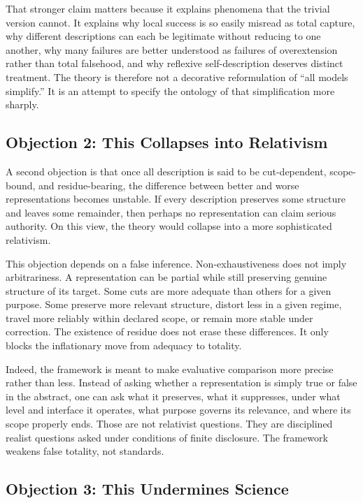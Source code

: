 \documentclass[11pt]{article}
\begin{document}
That stronger claim matters because it explains phenomena that the trivial version cannot. It explains why local success is so easily misread as total capture, why different descriptions can each be legitimate without reducing to one another, why many failures are better understood as failures of overextension rather than total falsehood, and why reflexive self-description deserves distinct treatment. The theory is therefore not a decorative reformulation of ``all models simplify.'' It is an attempt to specify the ontology of that simplification more sharply.

\subsection{Objection 2: This Collapses into Relativism}

A second objection is that once all description is said to be cut-dependent, scope-bound, and residue-bearing, the difference between better and worse representations becomes unstable. If every description preserves some structure and leaves some remainder, then perhaps no representation can claim serious authority. On this view, the theory would collapse into a more sophisticated relativism.

This objection depends on a false inference. Non-exhaustiveness does not imply arbitrariness. A representation can be partial while still preserving genuine structure of its target. Some cuts are more adequate than others for a given purpose. Some preserve more relevant structure, distort less in a given regime, travel more reliably within declared scope, or remain more stable under correction. The existence of residue does not erase these differences. It only blocks the inflationary move from adequacy to totality. \cite{chakravartty_scientific_realism_sep,ladyman_structural_realism_sep,scientific_pluralism_sep}

Indeed, the framework is meant to make evaluative comparison more precise rather than less. Instead of asking whether a representation is simply true or false in the abstract, one can ask what it preserves, what it suppresses, under what level and interface it operates, what purpose governs its relevance, and where its scope properly ends. Those are not relativist questions. They are disciplined realist questions asked under conditions of finite disclosure. The framework weakens false totality, not standards.

\subsection{Objection 3: This Undermines Science}
\end{document}
